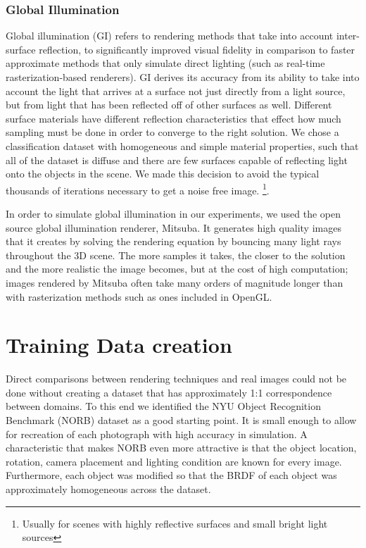 \documentclass[10pt,twocolumn,letterpaper]{article}
\begin{document}
\subsubsection{Global Illumination}\label{mitsuba_section}

Global illumination (GI) refers to rendering methods that take into account inter-surface reflection, to significantly improved visual fidelity in comparison to faster approximate methods that only simulate direct lighting (such as real-time rasterization-based renderers).  GI derives its accuracy from its ability to take into account the light that arrives at a surface not just directly from a light source, but from light that has been reflected off of other surfaces as well. Different surface materials have different reflection characteristics that effect how much sampling must be done in order to converge to the right solution. We chose a classification dataset with homogeneous and simple material properties, such that all of the dataset is diffuse and there are few surfaces capable of reflecting light onto the objects in the scene. We made this decision to avoid the typical thousands of iterations necessary to get a noise free image. \footnote{Usually for scenes with highly reflective surfaces and small bright light sources}.

In order to simulate global illumination in our experiments, we used the open source global illumination renderer, Mitsuba.  It generates high quality images that it creates by solving the rendering equation by bouncing many light rays throughout the 3D scene.  The more samples it takes, the closer to the solution and the more realistic the image becomes, but at the cost of high computation; images rendered by Mitsuba often take many orders of magnitude longer than with rasterization methods such as ones included in OpenGL.  

\section{Training Data creation}
Direct comparisons between rendering techniques and real images could not be done without creating a dataset that has approximately 1:1 correspondence between domains.  To this end we identified the NYU Object Recognition Benchmark (NORB) dataset \cite{LeCun:2004:LMG:1896300.1896315} as a good starting point. It is small enough to allow for recreation of each photograph with high accuracy in simulation.  A characteristic that makes NORB even more attractive is that the object location, rotation, camera placement and lighting condition are known for every image. Furthermore, each object was modified so that the BRDF of each object was approximately homogeneous across the dataset.
\end{document}
